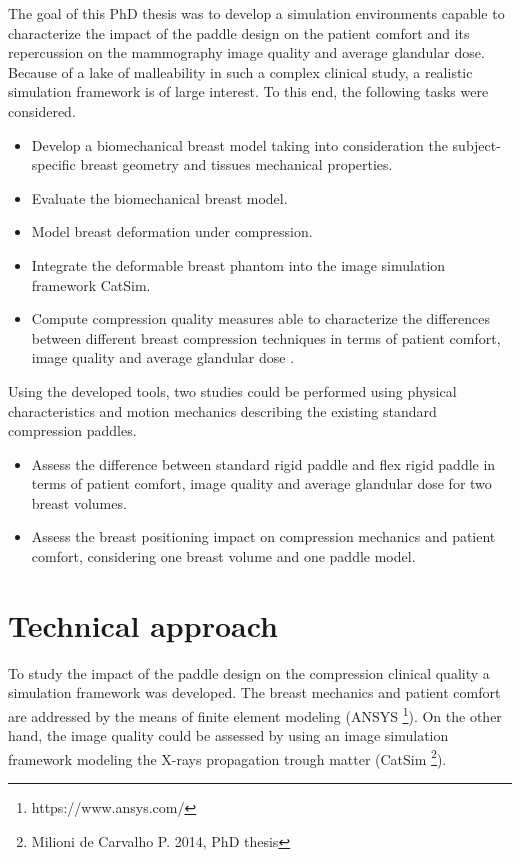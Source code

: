 The goal of this PhD thesis was to develop a simulation environments capable to characterize the impact of the paddle design on the patient comfort and its repercussion on the mammography image quality and average glandular dose.  Because of a lake of malleability in such a complex clinical study, a realistic simulation framework is of large interest. To this end, the following tasks were considered.
\begin{itemize}
\item Develop a biomechanical breast model taking into consideration  the subject-specific breast geometry and tissues mechanical properties. 

\item Evaluate the biomechanical breast model. 

\item Model breast deformation under compression.

\item Integrate the deformable breast phantom into the image simulation framework CatSim.
\item Compute compression quality measures able to characterize the differences between different breast compression techniques in terms of patient comfort, image quality and average glandular dose .  

\end{itemize}   

Using the developed tools, two studies could be performed using physical characteristics and motion mechanics describing the existing standard compression paddles.
\begin{itemize}
\item Assess the difference between standard rigid paddle and flex rigid paddle in terms of patient comfort, image quality and average glandular dose for two breast volumes.

\item  Assess the breast positioning impact on compression mechanics and patient comfort, considering one breast volume and one paddle model.
\end{itemize}
 
\cleardoublepage
\chapter*{Technical approach}\label{section:technicalapproach}
To study the impact of the paddle design  on the compression clinical quality a simulation framework was developed.  The breast mechanics and patient comfort are addressed by the means of finite element modeling (ANSYS \footnote{https://www.ansys.com/}). On the other hand, the image quality could be assessed by using an image simulation framework modeling the X-rays propagation trough matter (CatSim \footnote{Milioni de Carvalho P. 2014, PhD thesis}). 

